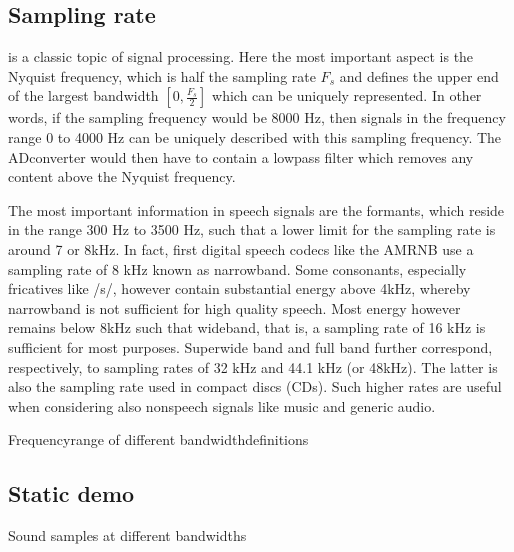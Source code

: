 \documentclass[letterpaper,10pt,english]{jupyterBook}
\begin{document}
\sphinxAtStartPar
{}


\subsection{Sampling rate}
\label{\detokenize{Representations/Waveform:sampling-rate}}
\sphinxAtStartPar
{}
is a classic topic of signal processing. Here the most important aspect
is the Nyquist frequency, which is half the sampling rate
\(F_s\) and defines the upper end of the largest bandwidth \(
\left[0, \frac{F_s}2\right] \) which can be uniquely represented.
In other words, if the sampling frequency would be 8000 Hz, then signals
in the frequency range 0 to 4000 Hz can be uniquely described with this
sampling frequency. The AD\sphinxhyphen{}converter would then have to contain a
low\sphinxhyphen{}pass filter which removes any content above the Nyquist frequency.

\sphinxAtStartPar
The most important information in speech signals are the formants, which
reside in the range 300 Hz to 3500 Hz, such that a lower limit for the
sampling rate is around 7 or 8kHz. In fact, first digital speech codecs
like the AMR\sphinxhyphen{}NB use a sampling rate of 8 kHz known as narrow\sphinxhyphen{}band. Some
consonants, especially fricatives like /s/, however contain substantial
energy above 4kHz, whereby narrow\sphinxhyphen{}band is not sufficient for high
quality speech. Most energy however remains below 8kHz such that
wide\sphinxhyphen{}band, that is, a sampling rate of 16 kHz is sufficient for most
purposes. Super\sphinxhyphen{}wide band and full band further correspond,
respectively, to sampling rates of 32 kHz and 44.1 kHz (or 48kHz). The
latter is also the sampling rate used in compact discs (CDs). Such
higher rates are useful when considering also non\sphinxhyphen{}speech signals like
music and generic audio.

\sphinxAtStartPar
Frequency\sphinxhyphen{}range of different bandwidth\sphinxhyphen{}definitions

\sphinxAtStartPar
{}


\subsection{Static demo}
\label{\detokenize{Representations/Waveform:static-demo}}
\sphinxAtStartPar
Sound samples at different bandwidths
\end{document}
